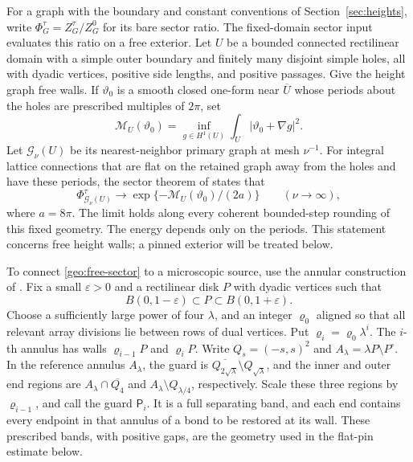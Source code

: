For a graph with the boundary and constant conventions of
Section~\ref{sec:heights}, write
\(\Phi_G^\tau=Z_G^\tau/Z_G^0\) for its bare sector ratio.
The fixed-domain sector input evaluates this ratio on a free exterior.
Let \(U\) be a bounded connected rectilinear domain with a simple outer
boundary and finitely many disjoint simple holes, all with dyadic vertices,
positive side lengths, and positive passages.  Give the height graph
free walls.  If \(\vartheta_0\) is a smooth closed one-form near
\(\overline U\) whose periods about the holes are prescribed multiples
of \(2\pi\), set
\[
 \mathcal M_U(\vartheta_0)
   =\inf_{g\in H^1(U)}\int_U|\vartheta_0+\nabla g|^2.
\]
Let \(\mathcal G_\nu(U)\) be its nearest-neighbor primary graph at mesh
\(\nu^{-1}\).  For integral lattice connections that are flat on the
retained graph away from the holes and have these periods,
the sector theorem of \cite[Theorem~3.1]{S} states that
\begin{equation}\label{geo:free-sector}
 \Phi_{\mathcal G_\nu(U)}^\tau
       \longrightarrow \exp\{-\mathcal M_U(\vartheta_0)/(2a)\}
       \qquad(\nu\to\infty),
\end{equation}
where \(a=8\pi\).  The limit holds along
every coherent bounded-step rounding of this fixed geometry.  The
energy depends only on the periods.  This statement concerns free
height walls; a pinned exterior will be treated below.

To connect \eqref{geo:free-sector} to a microscopic source, use the
annular construction of \cite[Sections~4 and~5]{S}.  Fix a small
\(\varepsilon>0\) and a rectilinear disk \(P\) with dyadic vertices
such that
\begin{equation}\label{geo:polygon}
 B(0,1-\varepsilon)\subset P\subset B(0,1+\varepsilon).
\end{equation}
Choose a sufficiently large power of four \(\lambda\), and an integer
\(\varrho_0\) aligned so that all relevant array divisions lie between
rows of dual vertices.  Put \(\varrho_i=\varrho_0\lambda^i\).
The \(i\)-th annulus has walls \(\varrho_{i-1}P\) and
\(\varrho_iP\).  Write \(Q_s=(-s,s)^2\) and
\(A_\lambda=\lambda P\setminus P^\circ\).  In the reference annulus
\(A_\lambda\), the guard is
\(\overline{Q_{2\sqrt\lambda}}\setminus Q_{\sqrt\lambda}\), and the
inner and outer end regions are \(A_\lambda\cap\overline{Q_4}\) and
\(A_\lambda\setminus Q_{\lambda/4}\), respectively.  Scale these
three regions by \(\varrho_{i-1}\), and call the guard \(\mathsf P_i\).
It is a full separating band, and each end contains every endpoint
in that annulus of a bond to be restored at its wall.  These prescribed
bands, with positive gaps, are the geometry used in the flat-pin
estimate below.

